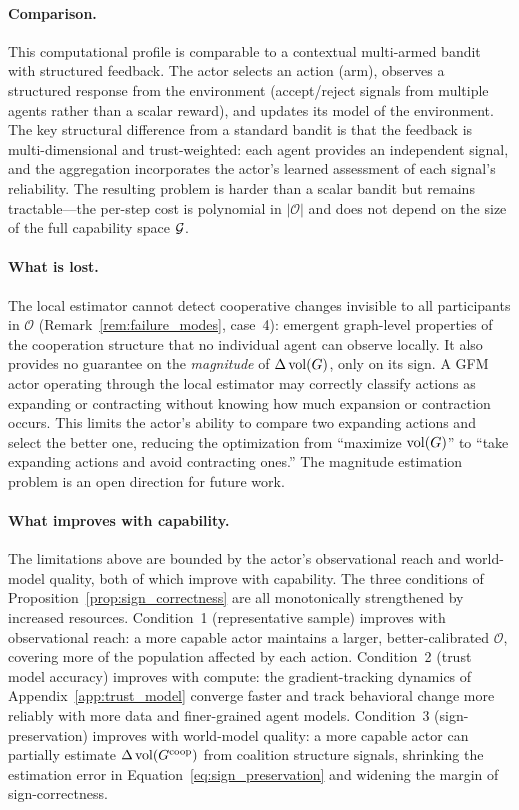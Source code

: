 \paragraph{Comparison.} This computational profile is comparable to a
contextual multi-armed bandit with structured feedback. The actor selects an
action (arm), observes a structured response from the environment
(accept/reject signals from multiple agents rather than a scalar reward), and
updates its model of the environment. The key structural difference from a
standard bandit is that the feedback is multi-dimensional and trust-weighted:
each agent provides an independent signal, and the aggregation incorporates the
actor's learned assessment of each signal's reliability. The resulting problem
is harder than a scalar bandit but remains tractable---the per-step cost is
polynomial in $|\mathcal{O}|$ and does not depend on the size of the full
capability space $\mathcal{G}$.

\paragraph{What is lost.} The local estimator cannot detect cooperative
changes invisible to all participants in $\mathcal{O}$
(Remark~\ref{rem:failure_modes}, case~4): emergent graph-level properties of
the cooperation structure that no individual agent can observe locally. It
also provides no guarantee on the \emph{magnitude} of
$\Delta \operatorname{vol}(G)$, only on its sign. A GFM actor operating through the local
estimator may correctly classify actions as expanding or contracting without
knowing how much expansion or contraction occurs. This limits the actor's
ability to compare two expanding actions and select the better one, reducing
the optimization from ``maximize $\operatorname{vol}(G)$'' to ``take expanding actions and
avoid contracting ones.'' The magnitude estimation problem is an open direction
for future work.

\paragraph{What improves with capability.} The limitations above are bounded by
the actor's observational reach and world-model quality, both of which improve
with capability. The three conditions of
Proposition~\ref{prop:sign_correctness} are all monotonically strengthened by
increased resources. Condition~1 (representative sample) improves with
observational reach: a more capable actor maintains a larger, better-calibrated
$\mathcal{O}$, covering more of the population affected by each action.
Condition~2 (trust model accuracy) improves with compute: the gradient-tracking
dynamics of Appendix~\ref{app:trust_model} converge faster and track behavioral
change more reliably with more data and finer-grained agent models. Condition~3
(sign-preservation) improves with world-model quality: a more capable actor can
partially estimate $\Delta\operatorname{vol}(G^{\mathrm{coop}})$ from coalition structure signals,
shrinking the estimation error in Equation~\eqref{eq:sign_preservation} and
widening the margin of sign-correctness.

